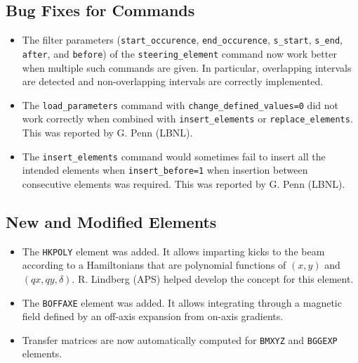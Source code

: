 \documentclass[11pt]{article}
\begin{document}
\subsection{Bug Fixes for Commands}
\begin{itemize}
\item The filter parameters (\verb|start_occurence|, \verb|end_occurence|, \verb|s_start|, \verb|s_end|, 
  \verb|after|, and \verb|before|)  of the \verb|steering_element| command now work better when multiple
  such commands are given. In particular, overlapping intervals are detected and non-overlapping intervals
  are correctly implemented.
\item The \verb|load_parameters| command with \verb|change_defined_values=0| 
  did not work correctly when combined with \verb|insert_elements| or \verb|replace_elements|.
  This was reported by G. Penn (LBNL).
\item The \verb|insert_elements| command would sometimes fail to insert all the intended elements when 
  \verb|insert_before=1| when insertion between consecutive elements was required.
  This was reported by G. Penn (LBNL).
\end{itemize}

\subsection{New and Modified Elements}
\begin{itemize}
\item The \verb|HKPOLY| element was added. It allows imparting kicks to the beam according to 
  a Hamiltonians that are polynomial functions of $(x, y)$ and $(qx, qy, \delta)$. R. Lindberg (APS) helped develop the
  concept for this element.
\item The \verb|BOFFAXE| element was added. It allows integrating through a magnetic field defined by an off-axis
  expansion from on-axis gradients. 
\item Transfer matrices are now automatically computed for \verb|BMXYZ| and \verb|BGGEXP| elements.
\end{itemize}
\end{document}
